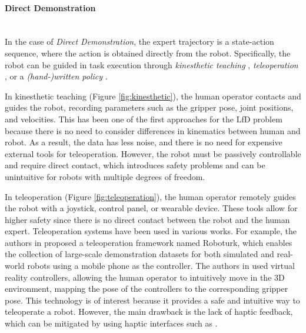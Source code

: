 \paragraph*{Direct Demonstration}  \mbox{} \\
In the case of \textit{Direct Demonstration}, the expert trajectory is a state-action sequence, where the action is obtained directly from the robot. Specifically, the robot can be guided in task execution through \textit{kinesthetic teaching} \cite{caccavale2019kinesthetic,johns2021coarse_to_fine}, \textit{teleoperation} \cite{zhang2018deep_vr_teleoperation,mandlekar2018roboturk,jang2022bc_z,brohan2022rt,ebert22Bridge,mandlekar2023mimicgen}, or a \textit{(hand-)written policy} \cite{dasari2020robonet,dasari2021transformers_one_shot,mandi2022towards_more_generalizable_one_shot,chang2023one}.

In kinesthetic teaching (Figure \ref{fig:kinesthetic}), the human operator contacts and guides the robot, recording parameters such as the gripper pose, joint positions, and velocities. This has been one of the first approaches for the LfD problem \cite{lee2011incremental,saveriano2015incremental} because there is no need to consider differences in kinematics between human and robot. As a result, the data has less noise, and there is no need for expensive external tools for teleoperation. However, the robot must be passively controllable and require direct contact, which introduces safety problems and can be unintuitive for robots with multiple degrees of freedom.

In teleoperation (Figure \ref{fig:teleoperation}), the human operator remotely guides the robot with a joystick, control panel, or wearable device. These tools allow for higher safety since there is no direct contact between the robot and the human expert. Teleoperation systems have been used in various works. For example, the authors in \cite{mandlekar2018roboturk,mandlekar2019scaling} proposed a teleoperation framework named Roboturk, which enables the collection of large-scale demonstration datasets \cite{mandlekar2019scaling,mandlekar2022matters} for both simulated and real-world robots using a mobile phone as the controller. The authors in \cite{zhang2018deep_vr_teleoperation,jang2022bc_z,brohan2022rt} used virtual reality controllers, allowing the human operator to intuitively move in the 3D environment, mapping the pose of the controllers to the corresponding gripper pose. This technology is of interest because it provides a safe and intuitive way to teleoperate a robot. However, the main drawback is the lack of haptic feedback, which can be mitigated by using haptic interfaces such as \cite{cyberglove,touch}.

